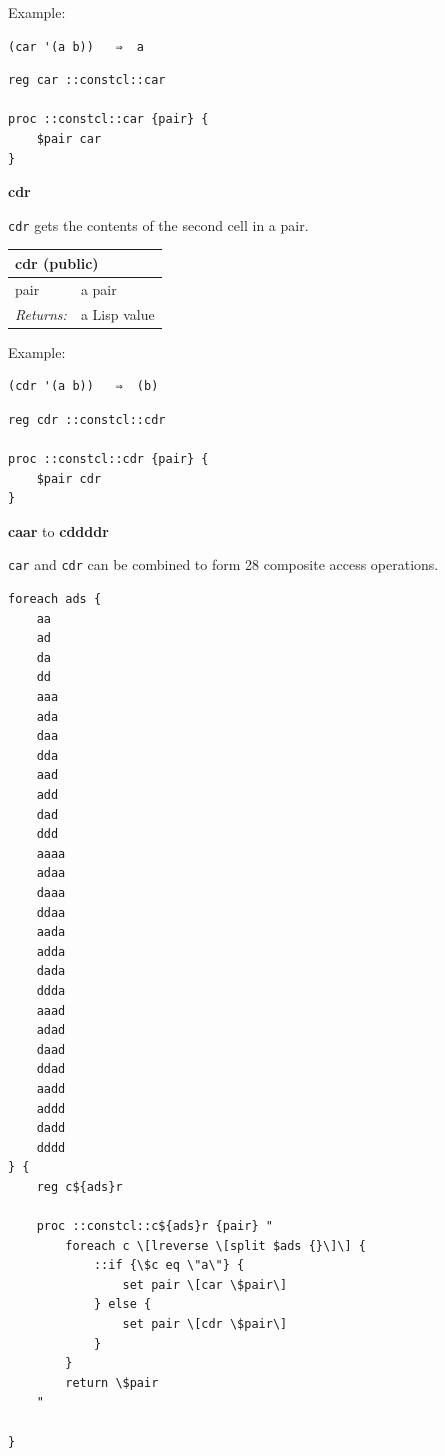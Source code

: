 \documentclass[twoside,9pt]{report}
\begin{document}
Example:

\noindent\makebox[\linewidth]{\rule{\linewidth}{0.4pt}}
\begin{lstlisting}
(car '(a b))   ⇒  a
\end{lstlisting}
\noindent\makebox[\linewidth]{\rule{\linewidth}{0.4pt}}
\noindent\makebox[\linewidth]{\rule{\linewidth}{0.4pt}}
\begin{lstlisting}
reg car ::constcl::car
 
proc ::constcl::car {pair} {
    $pair car
}
\end{lstlisting}
\noindent\makebox[\linewidth]{\rule{\linewidth}{0.4pt}}

\textbf{cdr}


\texttt{cdr} gets the contents of the second cell in a pair.

\begin{tabular}{ |l l| }
\hline
\multicolumn{2}{|l|}{cdr (public)} \\
\hline
pair & a pair \\
\textit{Returns:} & a Lisp value \\
\hline
\end{tabular}


Example:

\noindent\makebox[\linewidth]{\rule{\linewidth}{0.4pt}}
\begin{lstlisting}
(cdr '(a b))   ⇒  (b)
\end{lstlisting}
\noindent\makebox[\linewidth]{\rule{\linewidth}{0.4pt}}
\noindent\makebox[\linewidth]{\rule{\linewidth}{0.4pt}}
\begin{lstlisting}
reg cdr ::constcl::cdr
 
proc ::constcl::cdr {pair} {
    $pair cdr
}
\end{lstlisting}
\noindent\makebox[\linewidth]{\rule{\linewidth}{0.4pt}}

\textbf{caar} to \textbf{cddddr}


\texttt{car} and \texttt{cdr} can be combined to form 28 composite access operations.

\noindent\makebox[\linewidth]{\rule{\linewidth}{0.4pt}}
\begin{lstlisting}
foreach ads {
    aa
    ad
    da
    dd
    aaa
    ada
    daa
    dda
    aad
    add
    dad
    ddd
    aaaa
    adaa
    daaa
    ddaa
    aada
    adda
    dada
    ddda
    aaad
    adad
    daad
    ddad
    aadd
    addd
    dadd
    dddd
} {
    reg c${ads}r
 
    proc ::constcl::c${ads}r {pair} "
        foreach c \[lreverse \[split $ads {}\]\] {
            ::if {\$c eq \"a\"} {
                set pair \[car \$pair\]
            } else {
                set pair \[cdr \$pair\]
            }
        }
        return \$pair
    "
 
}
\end{lstlisting}
\noindent\makebox[\linewidth]{\rule{\linewidth}{0.4pt}}
\end{document}
